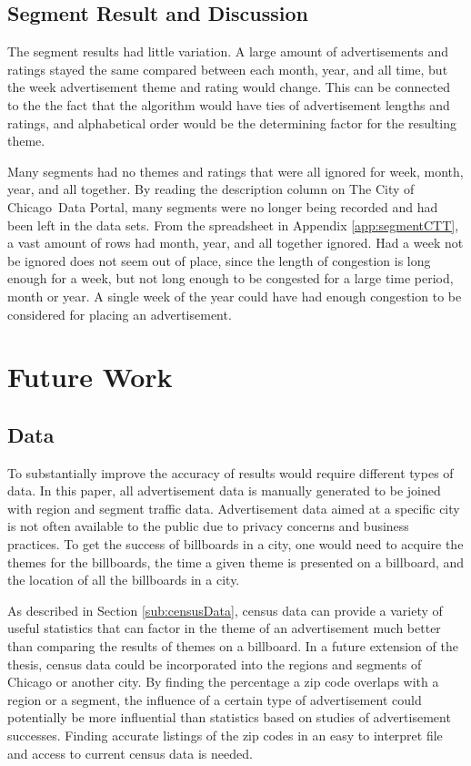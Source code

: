 \documentclass[titlepage,twocolumn]{article}
\newcommand{\CityChicago}{City of Chicago}
\begin{document}
\subsection{Segment Result and Discussion}

\par The segment results had little variation. A large amount of advertisements and ratings stayed the same compared between each month, year, and all time, but the week advertisement theme and rating would change. This can be connected to the the fact that the algorithm would have ties of advertisement lengths and ratings, and alphabetical order would be the determining factor for the resulting theme. 

\par Many segments had no themes and ratings that were all ignored for week, month, year, and all together. By reading the description column on The \CityChicago\ Data Portal, many segments were no longer being recorded and had been left in the data sets.  From the spreadsheet in Appendix \ref{app:segmentCTT}, a vast amount of rows had month, year, and all together ignored. Had a week not be ignored does not seem out of place, since the length of congestion is long enough for a week, but not long enough to be congested for a large time period, month or year. A single week of the year could have had enough congestion to be considered for placing an advertisement. 

\section{Future Work}
\label{sec:futureWork}

\subsection{Data}

To substantially improve the accuracy of results would require different types of data. In this paper, all advertisement data is manually generated to be joined with region and segment traffic data. Advertisement data aimed at a specific city is not often available to the public due to privacy concerns and business practices. To get the success of billboards in a city, one would need to acquire the themes for the billboards, the time a given theme is presented on a billboard, and the location of all the billboards in a city. 

As described in Section \ref{sub:censusData}, census data can provide a variety of useful statistics that can factor in the theme of an advertisement much better than comparing the results of themes on a billboard. In a future extension of the thesis, census data could be incorporated into the regions and segments of Chicago or another city. By finding the percentage a zip code overlaps with a region or a segment, the influence of a certain type of advertisement could potentially be more influential than statistics based on studies of advertisement successes. Finding accurate listings of the zip codes in an easy to interpret file and access to current census data is needed. 
\end{document}
